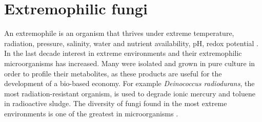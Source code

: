 \documentclass[12pt, a4paper]{report}
\begin{document}
\section{Extremophilic fungi}
An extremophile is an organism that thrives under extreme temperature, 
radiation, pressure, salinity, water and nutrient availability, pH, redox 
potential \cite{Rothschild2001}.  
In the last decade interest in extreme environments and their extremophilic 
microorganisms has increased. Many were isolated and grown in pure culture in order to  
profile their metabolites, as these products are useful for the development of a bio-based 
economy. For example \textit{Deinococcus radiodurans}, the most radiation-resistant organism, is used to degrade ionic mercury and toluene in radioactive sludge. The diversity of fungi found in the most extreme environments is one of the greatest in microorganisms \cite{Gostincar2010}. %
\end{document}
